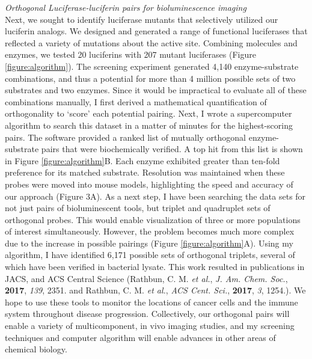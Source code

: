 \documentclass[11pt]{article}
\begin{document}
\textit{Orthogonal Luciferase-luciferin pairs for bioluminescence imaging}\\
Next, we sought to identify luciferase mutants that selectively utilized our luciferin analogs. We designed and generated a range of functional luciferases that reflected a variety of mutations about the active site. Combining molecules and enzymes, we tested 20 luciferins with 207 mutant luciferases (Figure \ref{figure:algorithm}). The screening experiment generated 4,140 enzyme-substrate combinations, and thus a potential for more than 4 million possible sets of two substrates and two enzymes. Since it would be impractical to evaluate all of these combinations manually, I first derived a mathematical quantification of orthogonality to ‘score’ each potential pairing. Next, I wrote a supercomputer algorithm to search this dataset in a matter of minutes for the highest-scoring pairs. The software provided a ranked list of mutually orthogonal enzyme-substrate pairs that were biochemically verified. A top hit from this list is shown in Figure \ref{figure:algorithm}B. Each enzyme exhibited greater than ten-fold preference for its matched substrate. Resolution was maintained when these probes were moved into mouse models, highlighting the speed and accuracy of our approach (Figure 3A). As a next step, I have been searching the data sets for not just pairs of bioluminescent tools, but triplet and quadruplet sets of orthogonal probes. This would enable visualization of three or more populations of interest simultaneously. However, the problem becomes much more complex due to the increase in possible pairings (Figure \ref{figure:algorithm}A). Using my algorithm, I have identified 6,171 possible sets of orthogonal triplets, several of which have been verified in bacterial lysate. This work resulted in publications in JACS, and ACS Central Science (Rathbun, C. M. \textit{et al.}, \textit{J. Am. Chem. Soc.}, \textbf{2017}, \textit{139}, 2351. and Rathbun, C. M. \textit{et al.}, \textit{ACS Cent. Sci.}, \textbf{2017}, \textit{3}, 1254.). We hope to use these tools to monitor the locations of cancer cells and the immune system throughout disease progression. Collectively, our orthogonal pairs will enable a variety of multicomponent, in vivo imaging studies, and my screening techniques and computer algorithm will enable advances in other areas of chemical biology.
\end{document}
